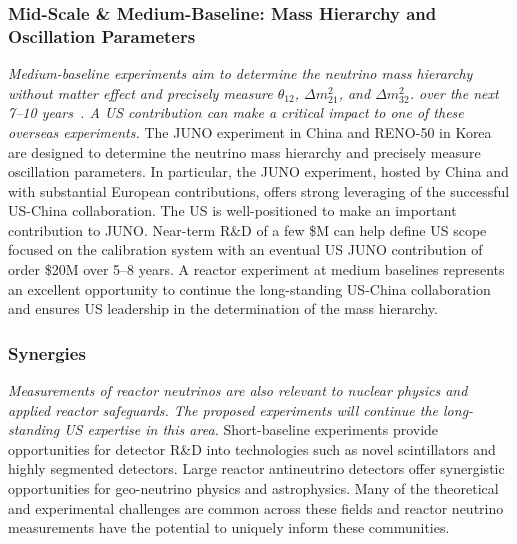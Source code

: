 \subsubsection{Mid-Scale \& Medium-Baseline: Mass Hierarchy and Oscillation Parameters}
 {\em Medium-baseline experiments aim to determine the neutrino mass
hierarchy without matter effect and precisely measure $\theta_{12}$,
$\Delta m^2_{21}$, and $\Delta m^2_{32}$. over the next 7--10
years~\cite{Kettell:2013eos}. A US contribution can make a critical
impact to one of these overseas experiments.} The JUNO experiment in
China and RENO-50 in Korea are designed to determine the neutrino mass
hierarchy and precisely measure oscillation parameters. In particular,
the JUNO experiment, hosted by China and with substantial European
contributions, offers strong leveraging of the successful US-China
collaboration. The US is well-positioned to make an important
contribution to JUNO.  Near-term R\&D of a few \$M can help define US
scope focused on the calibration system with an eventual US JUNO
contribution of order \$20M over 5--8 years.  A reactor experiment at
medium baselines represents an excellent opportunity to continue the
long-standing US-China collaboration and ensures US leadership in the
determination of the mass hierarchy.

\subsubsection{Synergies} 
{\em Measurements of reactor neutrinos are also relevant to nuclear
physics and applied reactor safeguards. The proposed experiments will
continue the long-standing US expertise in this area.} Short-baseline
experiments provide opportunities for detector R\&D into technologies
such as novel scintillators and highly segmented detectors. Large
reactor antineutrino detectors offer synergistic opportunities for
geo-neutrino physics and astrophysics. Many of the theoretical and
experimental challenges are common across these fields and reactor
neutrino measurements have the potential to uniquely inform these
communities.
